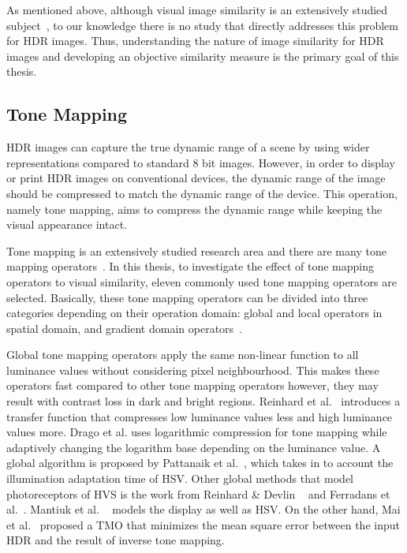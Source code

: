 As mentioned above, although visual image similarity is an extensively studied subject~\cite{liu2007survey}, to our knowledge there is no study that directly addresses this problem for HDR images. Thus, understanding the nature of image similarity for HDR images and developing an objective similarity measure is the primary goal of this thesis. 

\subsection{Tone Mapping}
HDR images can capture the true dynamic range of a scene by using wider representations compared to standard 8 bit images. However, in order to display or print HDR images on conventional devices, the dynamic range of the image should be compressed to match the dynamic range of the device. This operation, namely tone mapping, aims to compress the dynamic range while keeping the visual appearance intact. 

Tone mapping is an extensively studied research area and there are many tone mapping operators~\cite{Rein2010}. In this thesis, to investigate the effect of tone mapping operators to visual similarity, eleven commonly used tone mapping operators are selected. Basically, these tone mapping operators can be divided into three categories depending on their operation domain: global and local operators in spatial domain, and gradient domain operators~\cite{Rein2010}. 

Global tone mapping operators apply the same non-linear function to all luminance values without considering pixel neighbourhood. This makes these operators fast compared to other tone mapping operators however, they may result with contrast loss in dark and bright regions. Reinhard et al.~\cite{reinhard2002photographic} introduces a transfer function that compresses low luminance values less and high luminance values more. Drago et al. \cite{drago2003adaptive} uses logarithmic compression for tone mapping while adaptively changing the logarithm base depending on the luminance value. A global algorithm is proposed by Pattanaik et al.~\cite{pattanaik2000time}, which takes in to account the illumination adaptation time of HSV. Other global methods that model photoreceptors of HVS is the work from Reinhard \& Devlin ~\cite{reinhard2005dynamic} and Ferradans et al.~\cite{ferradans2011analysis}. Mantiuk et al. ~\cite{mantiuk2008display} models the display as well as HSV. On the other hand, Mai et al.~\cite{mai2010optimizing} proposed a TMO that minimizes the mean square error between the input HDR and the result of inverse tone mapping.

